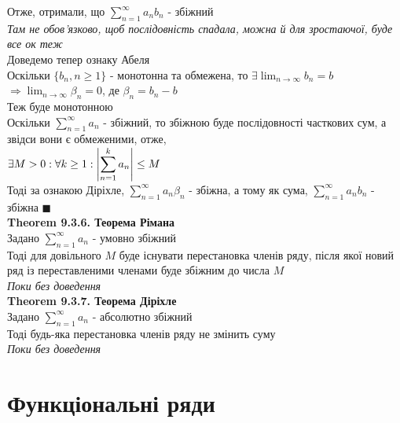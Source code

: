 \documentclass[a4paper, 14pt]{extarticle}
\def\huge{\displaystyle}
\def\bigline{\vspace{5mm}\\}
\def\th#1{\textbf{Theorem {#1}}}
\def\bigline{\vspace{5mm}\\}
\def\qed{$\blacksquare$}
\begin{document}
Отже, отримали, що $\huge \sum_{n=1}^{\infty} a_n b_n$ - збіжний\\
\textit{Там не обов'язково, щоб послідовність спадала, можна й для зростаючої, буде все ок теж}
\bigline
Доведемо тепер ознаку Абеля\\
Оскільки $\{b_n, n \geq 1\}$ - монотонна та обмежена, то $\exists \huge \lim_{n \to \infty} b_n = b$\\
$\Rightarrow \huge \lim_{n \to \infty} \beta_n = 0$, де $\beta_n = b_n - b$\\
Теж буде монотонною\\
Оскільки $\huge \sum_{n=1}^{\infty} a_n$ - збіжний, то збіжною буде послідовності часткових сум, а звідси вони є обмеженими, отже,\\
$\exists M > 0: \forall k \geq 1: \huge \abs{\sum_{n=1}^k a_n} \leq M$\\
Тоді за ознакою Діріхле, $\huge \sum_{n=1}^{\infty} a_n \beta_n$ - збіжна, а тому як сума, $\huge \sum_{n=1}^{\infty} a_n b_n$ - збіжна \qed \bigline
\th{9.3.6. Теорема Рімана}\\
Задано $\huge \sum_{n=1}^\infty a_n$ - умовно збіжний\\
Тоді для довільного $M$ буде існувати перестановка членів ряду, після якої новий ряд із переставленими членами буде збіжним до числа $M$\\
\textit{Поки без доведення}
\bigline
\th{9.3.7. Теорема Діріхле}\\
Задано $\huge \sum_{n=1}^\infty a_n$ - абсолютно збіжний\\
Тоді будь-яка перестановка членів ряду не змінить суму\\
\textit{Поки без доведення}
\newpage
\section{Функціональні ряди}
\end{document}
